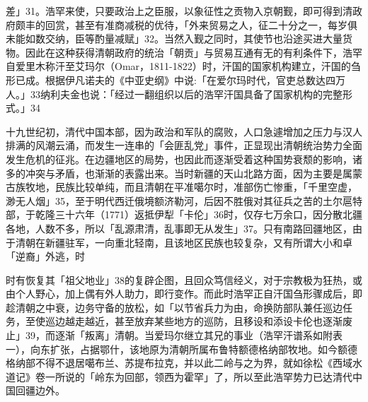 \noindent 差」31。浩罕来使，只要政治上之臣服，以象征性之贡物入京朝觐，即可得到清政府颇丰的回赏，甚至有准商减税的优待，「外来贸易之人，征二十分之一，每岁俱未能如数交纳，臣等酌量减赋」32。当然入觐之同时，其使节也沿途买进大量货物。因此在这种获得清朝政府的统治「朝贡」与贸易互通有无的有利条件下，浩罕自爱里木称汗至艾玛尔（Omar，1811-1822）时，汗国的国家机构建立，汗国的刍形已成。根据伊凡诺夫的《中亚史纲》中说:「在爱尔玛时代，官吏总数达四万人。」33纳利夫金也说：「经过一翻组织以后的浩罕汗国具备了国家机构的完整形式。」34


十九世纪初，清代中国本部，因为政治和军队的腐败，人口急遽增加之压力与汉人排满的风潮云涌，而发生一连串的「会匪乱党」事件，正显现出清朝统治势力全面发生危机的征兆。在边疆地区的局势，也因此而逐渐受着这种国势衰颓的影响，诸多的冲突与矛盾，也渐渐的表露出来。当时新疆的天山北路方面，因为主要是属蒙古族牧地，民族比较单纯，而且清朝在平准噶尔时，准部伤亡惨重，「千里空虚，渺无人烟」35，至于明代西迁俄境额济勒河，后因不胜俄对其征兵之苦的土尔扈特部，于乾隆三十六年（1771）返抵伊犁「卡伦」36时，仅存七万余口，因分散北疆各地，人数不多，所以「乱源肃清，乱事即无从发生」37。只有南路回疆地区，由于清朝在新疆驻军，一向重北轻南，且该地区民族也较复杂，又有所谓大小和卓「逆裔」外逃，时

\vfill
\begin{BookNotes}
\end{BookNotes}

\noindent 时有恢复其「祖父地业」38的复辟企图，且回众笃信经义，对于宗教极为狂热，或由个人野心，加上偶有外人助力，即行变作。而此时浩罕正自汗国刍形骤成后，即趁清朝之中衰，边务守备的放松，如「以节省兵力为由，命换防部队兼任巡边任务，至使巡边越走越近，甚至放弃某些地方的巡防，且移设和添设卡伦也逐渐废止」39，而逐渐「叛离」清朝。当爱玛尔继立其兄的事业（浩罕汗谱系如附表一），向东扩张，占据鄂什，该地原为清朝所属布鲁特额德格纳部牧地。如今额德格纳部不得不退居噶布兰、苏提布拉克，并以此二岭与之为界，就如徐松《西域水道记》卷一所说的「岭东为回部，领西为霍罕」了，所以至此浩罕势力已达清代中国回疆边外。

